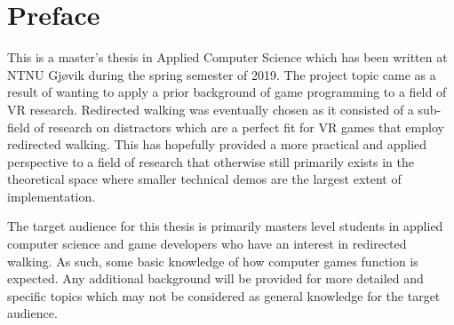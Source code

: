 \hypersetup{pageanchor=false}
%

\chapter*{Preface}
This is a master's thesis in Applied Computer Science which has been written at NTNU Gjøvik during the spring semester of 2019. The project topic came as a result of wanting to apply a prior background of game programming to a field of VR research. Redirected walking was eventually chosen as it consisted of a sub-field of research on distractors which are a perfect fit for VR games that employ redirected walking. This has hopefully provided a more practical and applied perspective to a field of research that otherwise still primarily exists in the theoretical space where smaller technical demos are the largest extent of implementation.  

The target audience for this thesis is primarily masters level students in applied computer science and game developers who have an interest in redirected walking. As such, some basic knowledge of how computer games function is expected. Any additional background will be provided for more detailed and specific topics which may not be considered as general knowledge for the target audience.\\[2cm]

\thesisdate \\[1pc]
\\[1pc]
